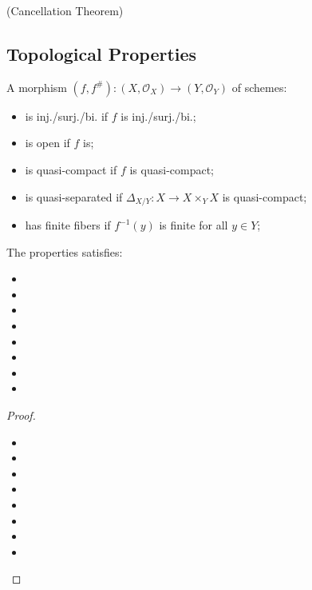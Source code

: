 \documentclass[Total.tex]{subfiles}
\begin{document}
				\begin{theorem}
					(Cancellation Theorem)
				\end{theorem}
			\subsection{Topological Properties}
				\begin{Def}
					A morphism $(f,f^\#):(X,\mathcal{O}_X)\rightarrow (Y,\mathcal{O}_Y)$ of schemes:
					\begin{itemize}
						\item is inj./surj./bi. if $f$ is inj./surj./bi.;
						\item is open if $f$ is;
						\item is quasi-compact if $f$ is quasi-compact;
						\item is quasi-separated if $\Delta_{X/Y}:X\rightarrow X\times_Y X$ is quasi-compact;
						\item has finite fibers if $f^{-1}(y)$ is finite for all $y\in Y$;
					\end{itemize}
				\end{Def}
				
				\begin{proposition}
					The properties satisfies:
					\begin{itemize}
						\item 
						\item 
						\item 
						\item 
						\item 
						\item 
						\item 
						\item 
					\end{itemize}
				\end{proposition}
				\begin{proof}
						\begin{itemize}
						\item 
						\item 
						\item 
						\item 
						\item 
						\item 
						\item 
						\item 
					\end{itemize}
				\end{proof}
\end{document}

